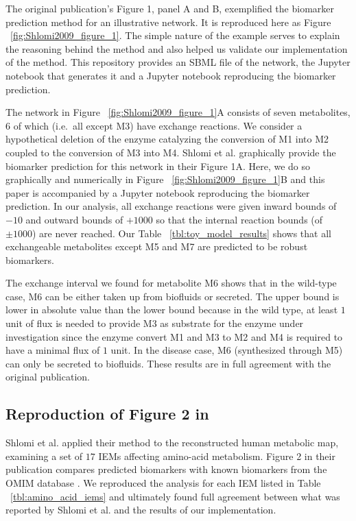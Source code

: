 \documentclass[10pt,a4paper,onecolumn]{article}
\begin{document}
The original publication's Figure 1, panel A and B, exemplified the
biomarker prediction method for an illustrative network. It is
reproduced here as Figure ~\ref{fig:Shlomi2009_figure_1}. The simple
nature of the example serves to explain the reasoning behind the method
and also helped us validate our implementation of the method. This
repository provides an SBML file of the network, the Jupyter notebook
that generates it and a Jupyter notebook reproducing the biomarker
prediction.

The network in Figure ~\ref{fig:Shlomi2009_figure_1}A consists of seven
metabolites, \(6\) of which (i.e.~all except M3) have exchange
reactions. We consider a hypothetical deletion of the enzyme catalyzing
the conversion of M1 into M2 coupled to the conversion of M3 into M4.
Shlomi et al. graphically provide the biomarker prediction for this
network in their Figure 1A. Here, we do so graphically and numerically
in Figure ~\ref{fig:Shlomi2009_figure_1}B and this paper is accompanied
by a Jupyter notebook reproducing the biomarker prediction. In our
analysis, all exchange reactions were given inward bounds of \(-10\) and
outward bounds of \(+1000\) so that the internal reaction bounds (of
\(\pm 1000\)) are never reached. Our Table ~\ref{tbl:toy_model_results}
shows that all exchangeable metabolites except M5 and M7 are predicted
to be robust biomarkers.

The exchange interval we found for metabolite M6 shows that in the
wild-type case, M6 can be either taken up from biofluids or secreted.
The upper bound is lower in absolute value than the lower bound because
in the wild type, at least \(1\) unit of flux is needed to provide M3 as
substrate for the enzyme under investigation since the enzyme convert M1
and M3 to M2 and M4 is required to have a minimal flux of \(1\) unit. In
the disease case, M6 (synthesized through M5) can only be secreted to
biofluids. These results are in full agreement with the original
publication.

\subsection{\texorpdfstring{Reproduction of Figure 2 in
\autocite{Shlomi2009}}{Reproduction of Figure 2 in {[}@Shlomi2009{]}}}\label{reproduction-of-figure-2-in-shlomi2009}

Shlomi et al. applied their method to the reconstructed human metabolic
map, examining a set of \(17\) IEMs affecting amino-acid metabolism.
Figure 2 in their publication compares predicted biomarkers with known
biomarkers from the OMIM database \autocite{McKusick2007}. We reproduced
the analysis for each IEM listed in Table ~\ref{tbl:amino_acid_iems} and
ultimately found full agreement between what was reported by Shlomi et
al. and the results of our implementation.
\end{document}
